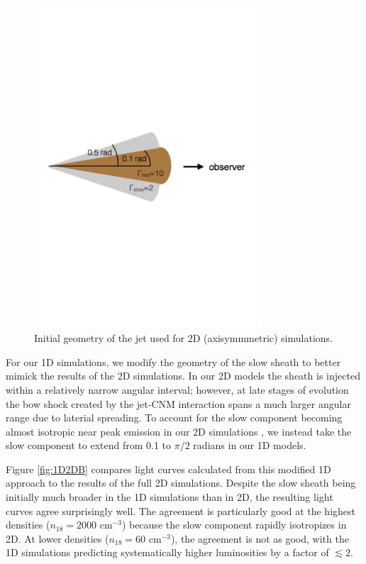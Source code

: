 \documentclass[usenatbib,fleqn]{mnras}
\begin{document}
\begin{figure}
\includegraphics[width=8.5cm]{jetstruct.pdf}
\caption{\label{fig:jetstruct} Initial geometry of the jet used for 2D
  (axisymmmetric) simulations.}
\end{figure}

For our 1D simulations, we modify the geometry of the slow sheath to
better mimick the results of the 2D simulations.  In our 2D models the
sheath is injected within a relatively narrow angular interval;
however, at late stages of evolution the bow shock created by the
jet-CNM interaction spans a much larger angular range due to laterial
spreading.  To account for the slow component becoming almost
isotropic near peak emission in our 2D simulations \citep[bottom two
panels of Fig.~8 in][]{Mimica+2015}, we instead take the slow
component to extend from 0.1 to $\pi/2$ radians in our 1D models.

Figure \ref{fig:1D2DB} compares light curves calculated from this
modified 1D approach to the results of the full 2D simulations.
Despite the slow sheath being initially much broader in the 1D
simulations than in 2D, the resulting light curves agree surprisingly
well.  The agreement is particularly good at the highest densities
($n_{18}=2000$ cm$^{-3}$) because the slow component rapidly
isotropizes in 2D.  At lower densities ($n_{18}=60$ cm$^{-3}$), the
agreement is not as good, with the 1D simulations predicting
systematically higher luminosities by a factor of $\lesssim 2$.
\end{document}
